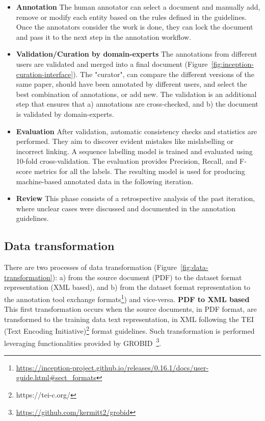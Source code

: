 \documentclass[fleqn,10pt]{wlscirep}
\begin{document}
\begin{itemize}
\item \textbf{Annotation} The human annotator can select a document and manually add, remove or modify each entity based on the rules defined in the guidelines. Once the annotators consider the work is done, they can lock the document and pass it to the next step in the annotation workflow. 

\item \textbf{Validation/Curation by domain-experts} The annotations from different users are validated and merged into a final document (Figure~\ref{fig:inception-curation-interface}). 
The "curator", can compare the different versions of the same paper, should have been annotated by different users, and select the best combination of annotations, or add new. 
The validation is an additional step that ensures that a) annotations are cross-checked, and b) the document is validated by domain-experts.

\item \textbf{Evaluation} After validation, automatic consistency checks and statistics are performed. They aim to discover evident mistakes like mislabelling or incorrect linking. 
A sequence labelling model is trained and evaluated using 10-fold cross-validation. The evaluation provides Precision, Recall, and F-score metrics for all the labels.
The resulting model is used for producing machine-based annotated data in the following iteration.

\item \textbf{Review} This phase consists of a retrospective analysis of the past iteration, where unclear cases were discussed and documented in the annotation guidelines. 


\end{itemize}

\subsection*{Data transformation}
\label{subsec:transformation-of-data}
There are two processes of data transformation (Figure~\ref{fig:data-transformation}): a) from the source document (PDF) to the dataset format representation (XML based), and b) from the dataset format representation to the annotation tool exchange formats\footnote{\url{https://inception-project.github.io/releases/0.16.1/docs/user-guide.html\#sect_formats}}) and vice-versa. 
\textbf{PDF to XML based}
This first transformation occurs when the source documents, in PDF format, are transformed to the training data text representation, in XML following the TEI (Text Encoding Initiative)\footnote{https://tei-c.org/} format guidelines.  
Such transformation is performed leveraging functionalities provided by GROBID~\footnote{\url{https://github.com/kermitt2/grobid}}.
\end{document}
